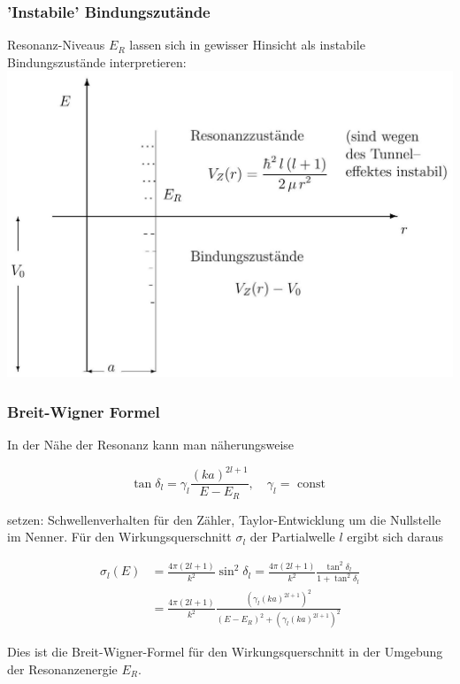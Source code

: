 \documentclass[10pt, letterpaper]{article}
\begin{document}
\subsubsection*{'Instabile' Bindungszutände}
Resonanz-Niveaus $E_{R}$ lassen sich in gewisser Hinsicht als instabile Bindungszustände interpretieren:\\
\includegraphics[scale=0.2, center]{2025_05_21_d5590f158a899e385c7cg-21}

\subsubsection*{Breit-Wigner Formel}
In der Nähe der Resonanz kann man näherungsweise

$$
\tan \delta_{l}=\gamma_{l} \frac{(k a)^{2 l+1}}{E-E_{R}}, \quad \gamma_{l}=\text { const }
$$

setzen: Schwellenverhalten für den Zähler, Taylor-Entwicklung um die Nullstelle im Nenner. Für den Wirkungsquerschnitt $\sigma_{l}$ der Partialwelle $l$ ergibt sich daraus

$$
\begin{aligned}
\sigma_{l}(E) & =\frac{4 \pi(2 l+1)}{k^{2}} \sin ^{2} \delta_{l}=\frac{4 \pi(2 l+1)}{k^{2}} \frac{\tan ^{2} \delta_{l}}{1+\tan ^{2} \delta_{l}} \\
& =\frac{4 \pi(2 l+1)}{k^{2}} \frac{\left(\gamma_{l}(k a)^{2 l+1}\right)^{2}}{\left(E-E_{R}\right)^{2}+\left(\gamma_{l}(k a)^{2 l+1}\right)^{2}}
\end{aligned}
$$

Dies ist die Breit-Wigner-Formel für den Wirkungsquerschnitt in der Umgebung der Resonanzenergie $E_{R}$.
\end{document}
